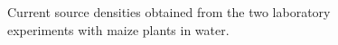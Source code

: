 \documentclass{article}
\begin{document}
\begin{figure}[p]
	\centering
	\captionsetup[sub]{margin=0.4cm}
	\caption{Current source densities obtained from the two laboratory experiments with maize plants in water.\label{iCSDWP}}
\end{figure}
\end{document}
